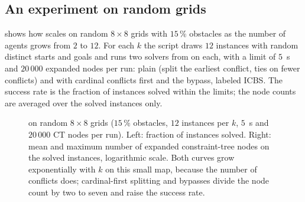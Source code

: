 \subsection{An experiment on random grids}
\label{sec:ch09-experiment}

 shows how \cbs scales on random $8 \times 8$ grids
with $15\,\%$ obstacles as the number of agents grows from $2$ to $12$. For
each $k$ the script  draws $12$
instances with random distinct starts and goals and runs two solvers from
 on each, with a limit of $5$~s and $20\,000$ expanded
nodes per run: plain \cbs (split the earliest conflict, ties on fewer
conflicts) and \cbs with cardinal conflicts first and the bypass, labeled
ICBS. The success rate is the fraction of instances solved within the
limits; the node counts are averaged over the solved instances only.

\begin{figure}[tb]
  \centering
  \caption{\cbs on random $8 \times 8$ grids ($15\,\%$ obstacles, $12$
    instances per $k$, $5$~s and $20\,000$ CT nodes per run). Left: fraction
    of instances solved. Right: mean and maximum number of expanded
    constraint-tree nodes on the solved instances, logarithmic scale. Both
    curves grow exponentially with $k$ on this small map, because the number
    of conflicts does; cardinal-first splitting and bypasses divide the node
    count by two to seven and raise the success rate.}
  \label{fig:ch09-scaling}
\end{figure}

